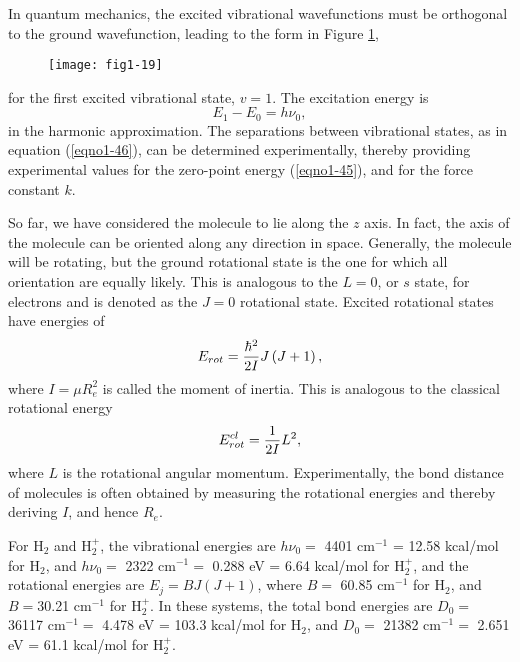 In quantum mechanics, the excited vibrational wavefunctions must be orthogonal 
to the ground wavefunction, leading to the form in Figure \ref{fig1-19},

\begin{figure}
\begin{center}
\texttt{[image: fig1-19]}
\end{center}
\caption{}
\label{fig1-19}
\end{figure}

\noindent
for the first excited vibrational state, $v = 1$. The excitation energy is
\begin{equation}
E_1 - E_0 = h \nu_0,
\label{eqno1-46}
\end{equation}
in the harmonic approximation. The separations between vibrational
states, as in equation (\ref{eqno1-46}), can be determined
experimentally, thereby providing experimental values for the
zero-point energy (\ref{eqno1-45}), and for the force constant $k$.
    
So far, we have considered the molecule to lie along the $z$ axis. In
fact, the axis of the molecule can be oriented along any direction in
space. Generally, the molecule will be rotating, but the ground
rotational state is the one for which all orientation are equally
likely. This is analogous to the $L = 0$, or $s$ state, for electrons
and is denoted as the $J = 0$ rotational state. Excited rotational
states have energies of
\begin{equation}
E_{rot} = {\hbar^2 \over 2I} J \left( J + 1 \right),
\end{equation}
where $I = \mu R^2_e$ is called the moment of inertia. This is analogous to the
classical rotational energy
\begin{equation}
E^{cl}_{rot} = {1 \over 2I} L^2 ,
\end{equation}
where $L$ is the rotational angular momentum. Experimentally, the bond distance of
molecules is often obtained by measuring the rotational energies and thereby deriving
$I$, and hence $R_e$.

For H$_2$ and H$^+_2$, the vibrational energies are $h \nu_0 =$ 4401
cm$^{-1}$ = 12.58 kcal/mol for H$_2$, and $h \nu_0 =$ 2322 cm$^{-1} =$
0.288 eV = 6.64 kcal/mol for H$^+_2$, and the rotational energies are
$E_j = BJ(J + 1)$, where $B =$ 60.85 cm$^{-1}$ for H$_2$, and $B =
$30.21 cm$^{-1}$ for H$^+_2$.  In these systems, the total bond
energies are $D_0 =$ 36117 cm$^{-1} =$ 4.478 eV = 103.3 kcal/mol for
H$_2$, and $D_0 =$ 21382 cm$^{-1} =$ 2.651 eV = 61.1 kcal/mol for
H$^+_2$.

